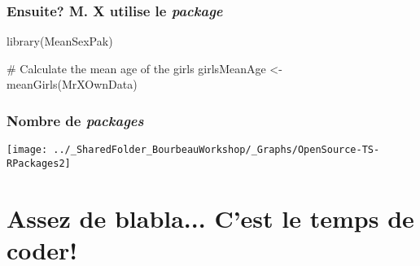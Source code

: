 \documentclass{beamer}
\begin{document}
    \begin{frame}[fragile=singleslide]
        \frametitle{Ensuite? M. X utilise le \emph{package}}
        \begin{code}
library(MeanSexPak)

# Calculate the mean age of the girls
girlsMeanAge <- meanGirls(MrXOwnData)
        \end{code}
    \end{frame}
    
    \begin{frame}
        \frametitle{Nombre de \emph{packages} \R}  \vspace{1.2cm}
        \begin{center}
            \texttt{[image: ../\_SharedFolder\_BourbeauWorkshop/\_Graphs/OpenSource-TS-RPackages2]}
        \end{center} 
    \end{frame}
   
\section{Assez de blabla... C'est le temps de coder!} 
  
\end{document}
